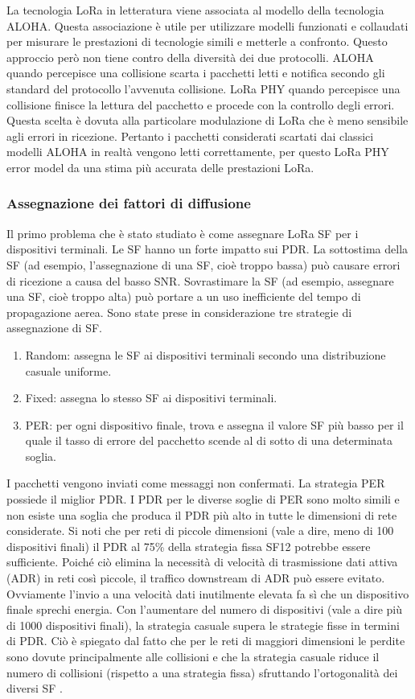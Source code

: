 \documentclass[a4paper]{report} %
\begin{document}
La tecnologia LoRa in letteratura viene associata al modello della tecnologia ALOHA. Questa associazione è utile per utilizzare modelli funzionati e collaudati per misurare le prestazioni di tecnologie simili e metterle a confronto. Questo approccio però non tiene contro della diversità dei due protocolli. ALOHA quando percepisce una collisione scarta i pacchetti letti e notifica secondo gli standard del protocollo l'avvenuta collisione. LoRa PHY quando percepisce una collisione finisce la lettura del pacchetto e procede con la controllo degli errori. Questa scelta è dovuta alla particolare modulazione di LoRa che è meno sensibile agli errori in ricezione. Pertanto i pacchetti considerati scartati dai classici modelli ALOHA in realtà vengono letti correttamente, per questo LoRa PHY error model da una stima più accurata delle prestazioni LoRa.    

\subsubsection{Assegnazione dei fattori di diffusione}
Il primo problema che è stato studiato è come assegnare LoRa SF per i dispositivi terminali. Le SF hanno un forte impatto sui PDR. La sottostima della SF (ad esempio, l'assegnazione di una SF, cioè troppo bassa) può causare errori di ricezione a causa del basso SNR. Sovrastimare la SF (ad esempio, assegnare una SF, cioè troppo alta) può portare a un uso inefficiente del tempo di propagazione aerea. Sono state prese in considerazione tre strategie di assegnazione di SF.
\begin{enumerate}
\item Random: assegna le SF ai dispositivi terminali secondo una distribuzione casuale uniforme.
\item Fixed: assegna lo stesso SF ai dispositivi terminali.
\item PER: per ogni dispositivo finale, trova e assegna il valore SF più basso per il quale il tasso di errore del pacchetto scende al di sotto di una determinata soglia.
\end{enumerate}
I pacchetti vengono inviati come messaggi non confermati. La strategia PER possiede il miglior PDR. I PDR per le diverse soglie di PER sono molto simili e non esiste una soglia che produca il PDR più alto in tutte le dimensioni di rete considerate. Si noti che per reti di piccole dimensioni (vale a dire, meno di 100 dispositivi finali) il PDR al 75\% della strategia fissa SF12 potrebbe essere sufficiente. Poiché ciò elimina la necessità di velocità di trasmissione dati attiva (ADR) in reti così piccole, il traffico downstream di ADR può essere evitato. Ovviamente l'invio a una velocità dati inutilmente elevata fa sì che un dispositivo finale sprechi energia. Con l'aumentare del numero di dispositivi (vale a dire più di 1000 dispositivi finali), la strategia casuale supera le strategie fisse in termini di PDR. Ciò è spiegato dal fatto che per le reti di maggiori dimensioni le perdite sono dovute principalmente alle collisioni e che la strategia casuale riduce il numero di collisioni (rispetto a una strategia fissa) sfruttando l'ortogonalità dei diversi SF \cite{art:rif.49}.
\end{document}
